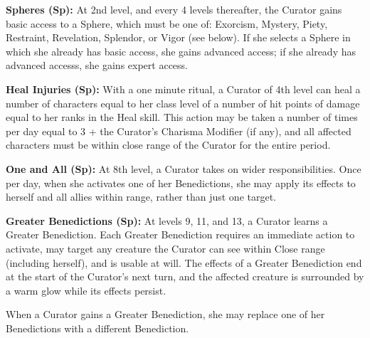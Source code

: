 \textbf{Spheres (Sp):} At 2nd level, and every 4 levels thereafter, the Curator gains basic access to a Sphere, which must be one of: Exorcism, Mystery, Piety, Restraint, Revelation, Splendor, or Vigor (see below). If she selects a Sphere in which she already has basic access, she gains advanced access; if she already has advanced accesss, she gains expert access.

\textbf{Heal Injuries (Sp):} With a one minute ritual, a Curator of 4th level can heal a number of characters equal to her class level of a number of hit points of damage equal to her ranks in the Heal skill. This action may be taken a number of times per day equal to 3 + the Curator's Charisma Modifier (if any), and all affected characters must be within close range of the Curator for the entire period.

\textbf{One and All (Sp):} At 8th level, a Curator takes on wider responsibilities. Once per day, when she activates one of her Benedictions, she may apply its effects to herself and all allies within range, rather than just one target.

\textbf{Greater Benedictions (Sp):} At levels 9, 11, and 13, a Curator learns a Greater Benediction. Each Greater Benediction requires an immediate action to activate, may target any creature the Curator can see within Close range (including herself), and is usable at will. The effects of a Greater Benediction end at the start of the Curator's next turn, and the affected creature is surrounded by a warm glow while its effects persist.

When a Curator gains a Greater Benediction, she may replace one of her Benedictions with a different Benediction.

